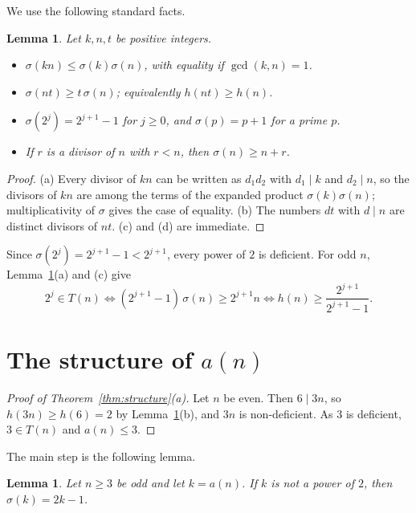 \documentclass[12pt,reqno]{article}
\theoremstyle{plain}
\newtheorem{lemma}[theorem]{Lemma}
\theoremstyle{definition}
\theoremstyle{remark}
\begin{document}
We use the following standard facts.

\begin{lemma}\label{lem:sigma}
Let $k, n, t$ be positive integers.
\begin{itemize}
\item[(a)] $\sigma(kn) \le \sigma(k)\sigma(n)$, with equality if $\gcd(k,n)=1$.
\item[(b)] $\sigma(nt) \ge t\,\sigma(n)$; equivalently $h(nt) \ge h(n)$.
\item[(c)] $\sigma(2^j) = 2^{j+1}-1$ for $j \ge 0$, and $\sigma(p) = p+1$ for a prime $p$.
\item[(d)] If $r$ is a divisor of $n$ with $r < n$, then $\sigma(n) \ge n + r$.
\end{itemize}
\end{lemma}

\begin{proof}
(a) Every divisor of $kn$ can be written as $d_1 d_2$ with $d_1 \mid k$ and
$d_2 \mid n$, so the divisors of $kn$ are among the terms of the expanded
product $\sigma(k)\sigma(n)$; multiplicativity of $\sigma$ gives the case of
equality. (b) The numbers $dt$ with $d \mid n$ are distinct divisors of $nt$.
(c) and (d) are immediate.
\end{proof}

Since $\sigma(2^j) = 2^{j+1}-1 < 2^{j+1}$, every power of $2$ is deficient. For
odd $n$, Lemma~\ref{lem:sigma}(a) and (c) give
\begin{equation}\label{eq:pow2}
  2^j \in T(n) \iff (2^{j+1}-1)\,\sigma(n) \ge 2^{j+1} n
  \iff h(n) \ge \frac{2^{j+1}}{2^{j+1}-1}.
\end{equation}

\section{The structure of \texorpdfstring{$a(n)$}{a(n)}}

\begin{proof}[Proof of Theorem~\ref{thm:structure}(a)]
Let $n$ be even. Then $6 \mid 3n$, so $h(3n) \ge h(6) = 2$ by
Lemma~\ref{lem:sigma}(b), and $3n$ is non-deficient. As $3$ is deficient,
$3 \in T(n)$ and $a(n) \le 3$.
\end{proof}

The main step is the following lemma.

\begin{lemma}\label{lem:key}
Let $n \ge 3$ be odd and let $k = a(n)$. If $k$ is not a power of $2$, then
$\sigma(k) = 2k-1$.
\end{lemma}
\end{document}
